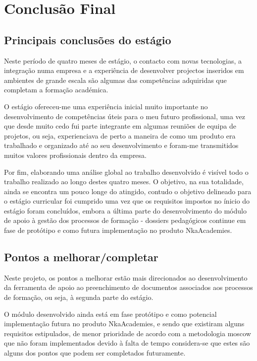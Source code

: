 \chapter{Conclusão Final}
\label{conc}
\section{Principais conclusões do estágio}

Neste período de quatro meses de estágio, o contacto com novas tecnologias, a integração numa empresa e a experiência de desenvolver projectos inseridos em ambientes de grande escala são algumas das competências adquiridas que completam a formação académica.

O estágio ofereceu-me uma experiência inicial muito importante no desenvolvimento de competências úteis para o meu futuro profissional, uma vez que desde muito cedo fui parte integrante em algumas reuniões de equipa de projetos, ou seja, experienciava de perto a maneira de como um produto era trabalhado e organizado até ao seu desenvolvimento e foram-me transmitidos muitos valores profissionais dentro da empresa.

Por fim, elaborando uma análise global ao trabalho desenvolvido é visível todo o trabalho realizado ao longo destes quatro meses. O objetivo, na sua totalidade, ainda se encontra um pouco longe do atingido, contudo o objetivo delineado para o estágio curricular foi cumprido uma vez que os requisitos impostos no ínicio do estágio foram concluídos, embora a última parte do desenvolvimento do módulo de apoio à gestão dos processos de formação - dossiers pedagógicos continue em fase de protótipo e como futura implementação no produto NkaAcademies.


\section{Pontos a melhorar/completar}

Neste projeto, os pontos a melhorar estão mais direcionados ao desenvolvimento da ferramenta de apoio ao preenchimento de documentos associados aos processos de formação, ou seja, à segunda parte do estágio.

O módulo desenvolvido ainda está em fase protótipo e como potencial implementação futura no produto NkaAcademies, e sendo que existiram alguns requisitos estipulados, de menor prioridade de acordo com a metodologia \acrshort{moscow} que não foram implementados devido à falta de tempo considera-se que estes são alguns dos pontos que podem ser completados futuramente.

